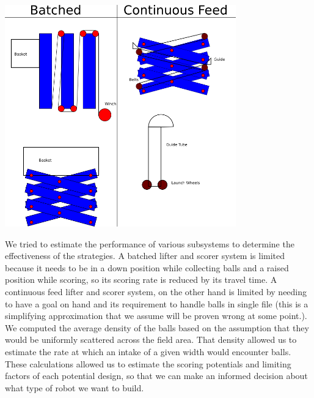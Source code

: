 \begin{center}
 \includegraphics[width=10cm]{./Entries/Images/BatchedContinuous.png}
\end{center}

We tried to estimate the performance of various subsystems to determine the effectiveness of the strategies. A batched lifter and scorer system is limited because it needs to be in a down position while collecting balls and a raised position while scoring, so its scoring rate is reduced by its travel time. A continuous feed lifter and scorer system, on the other hand is limited by needing to have a goal on hand and its requirement to handle balls in single file (this is a simplifying approximation that we assume will be proven wrong at some point.). We computed the average density of the balls based on the assumption that they would be uniformly scattered across the field area. That density allowed us to estimate the rate at which an intake of a given width would encounter balls. These calculations allowed us to estimate the scoring potentials and limiting factors of each potential design, so that we can make an informed decision about what type of robot we want to build.
